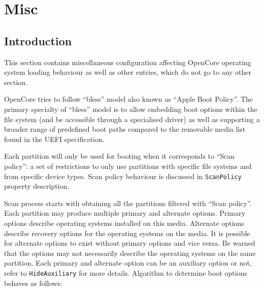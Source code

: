 \documentclass[]{article}
\begin{document}
\section{Misc}\label{misc}

\subsection{Introduction}\label{miscintro}

This section contains miscellaneous configuration affecting OpenCore operating system loading behaviour
as well as other entries, which do not go to any other section.

OpenCore tries to follow ``bless'' model also known as ``Apple Boot Policy''. The primary specialty of
``bless'' model is to allow embedding boot options within the file system (and be accessible through a
specialised driver) as well as supporting a broader range of predefined boot paths compared to the
removable media list found in the UEFI specification.

Each partition will only be used for booting when it corresponds to ``Scan policy'': a set of restrictions
to only use partitions with specific file systems and from specific device types. Scan policy behaviour is
discussed in \texttt{ScanPolicy} property description.

Scan process starts with obtaining all the partitions filtered with ``Scan policy''. Each partition may
produce multiple primary and alternate options. Primary options describe operating systems installed
on this media. Alternate options describe recovery options for the operating systems on the media.
It is possible for alternate options to exist without primary options and vice versa. Be warned
that the options may not necessarily describe the operating systems on the same partition.
Each primary and alternate option can be an auxiliary option or not, refer to \texttt{HideAuxiliary}
for more details. Algorithm to determine boot options behaves as follows:
\end{document}
